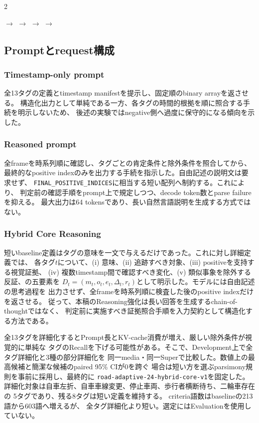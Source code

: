 \documentclass[9pt,a4paper]{extarticle}
\begin{document}
\begin{multicols}{2}
\begin{center}
\small
{}
$\rightarrow$
$\rightarrow$
$\rightarrow$
$\rightarrow$
\end{center}

\subsection{Promptとrequest構成}
\subsubsection*{Timestamp-only prompt}
全13タグの定義とtimestamp manifestを提示し、固定順のbinary arrayを返させる。
構造化出力として単純である一方、各タグの時間的根拠を順に照合する手続を明示しないため、
後述の実験ではnegative側へ過度に保守的になる傾向を示した。

\subsubsection*{Reasoned prompt}
全frameを時系列順に確認し、タグごとの肯定条件と除外条件を照合してから、
最終的なpositive indexのみを出力する手続を指示した。自由記述の説明文は要求せず、
\texttt{FINAL\_POSITIVE\_INDICES}に相当する短い配列へ制約する。これにより、
判定前の確認手順をprompt上で規定しつつ、decode token数とparse failureを抑える。
最大出力は64 tokensであり、長い自然言語説明を生成する方式ではない。

\subsubsection*{Hybrid Core Reasoning}
短いbaseline定義はタグの意味を一文で与えるだけであった。これに対し詳細定義では、
各タグ$t$について、(i) 意味、(ii) 追跡すべき対象、(iii) positiveを支持する視覚証拠、
(iv) 複数timestamp間で確認すべき変化、(v) 類似事象を除外する反証、の五要素を
$D_t=(m_t,o_t,e_t,\Delta_t,r_t)$として明示した。モデルには自由記述の思考過程を
出力させず、全frameを時系列順に検査した後のpositive indexだけを返させる。
従って、本稿のReasoning強化は長い回答を生成するchain-of-thoughtではなく、
判定前に実施すべき証拠照合手順を入力契約として構造化する方法である。

全13タグを詳細化するとPrompt長とKV-cache消費が増え、厳しい除外条件が視覚的に単純な
タグのRecallを下げる可能性がある。そこで、Development上で全タグ詳細化と3種の部分詳細化を
同一media・同一Superで比較した。数値上の最高候補と簡潔な候補のpaired 95\% CIが0を跨ぐ
場合は短い方を選ぶparsimony規則を事前に採用し、最終的に
\texttt{road-adaptive-24-hybrid-core-v1}を固定した。詳細化対象は自車左折、自車車線変更、停止車両、歩行者横断待ち、二輪車存在の
5タグであり、残る8タグは短い定義を維持する。
criteria語数はbaselineの213語から603語へ増えるが、
全タグ詳細化より短い。選定にはEvaluationを使用していない。


\end{multicols}
\end{document}
